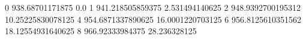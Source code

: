 0 938.68701171875 0.0
1 941.218505859375 2.531494140625
2 948.9392700195312 10.25225830078125
4 954.6871337890625 16.0001220703125
6 956.8125610351562 18.12554931640625
8 966.92333984375 28.236328125
